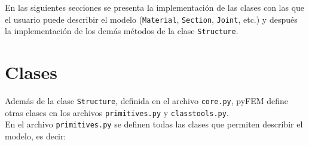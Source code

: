 




En las siguientes secciones se presenta la implementación de las clases con las que el usuario puede describir el modelo (\verb|Material|, \verb|Section|, \verb|Joint|, etc.) y después la implementación de los demás métodos de la clase \verb|Structure|.\\

\section{Clases}

Además de la clase \verb|Structure|, definida en el archivo \verb|core.py|, pyFEM define otras clases en los archivos \verb|primitives.py| y \verb|classtools.py|.\\

En el archivo \verb|primitives.py| se definen todas las clases que permiten describir el modelo, es decir:

